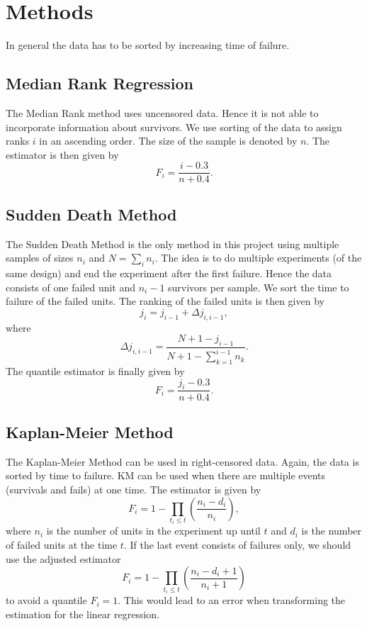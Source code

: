 \section{Methods}
In general the data has to be sorted by increasing time of failure.

\subsection{Median Rank Regression}
The Median Rank method uses uncensored data. Hence it is not able to incorporate information about survivors. 
We use sorting of the data to assign ranks $i$ in an ascending order. The size of the sample is denoted by $n$. The estimator is then given by
$$ F_i = \frac{i - 0.3}{n + 0.4}.$$

\subsection{Sudden Death Method}
The Sudden Death Method is the only method in this project using multiple samples of sizes $n_i$ and $N = \sum_{i}n_i$. The idea is to do multiple experiments (of the same design) and end the experiment after the first failure. Hence the data consists of one failed unit and $n_i - 1$ survivors per sample. We sort the time to failure of the failed units. The ranking of the failed units is then given by
$$ j_i = j_{i-1} + \Delta j_{i,i-1}, $$
where
$$ \Delta j_{i, i-1} = \frac{N + 1 - j_{i-1}}{N + 1 - \sum_{k=1}^{i-1} n_k}.$$
The quantile estimator is finally given by
$$ F_i = \frac{j_i - 0.3}{n + 0.4}. $$

\subsection{Kaplan-Meier Method}
The Kaplan-Meier Method can be used in right-censored data. Again, the data is sorted by time to failure. KM can be used when there are multiple events (survivals and fails) at one time.
The estimator is given by
$$ F_i = 1 - \prod_{t_i \leq t} \left( \frac{n_i - d_i}{n_i} \right), $$
where $n_i$ is the number of units in the experiment up until $t$ and $d_i$ is the number of failed units at the time $t$.
If the last event consists of failures only, we should use the adjusted estimator
$$ F_i = 1 - \prod_{t_i \leq t} \left( \frac{n_i - d_i + 1}{n_i + 1} \right) $$
to avoid a quantile $F_i = 1$. This would lead to an error when transforming the estimation for the linear regression.

